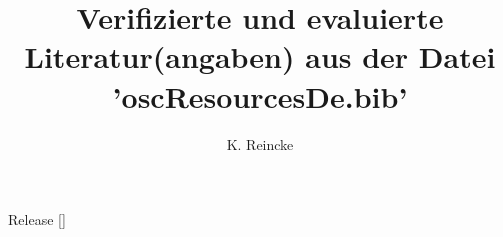 \documentclass[DIV=calc,BCOR=5mm,11pt,headings=small,oneside,abstract=true,toc=bib]{scrartcl}
\begin{document}
\nocite{*}


\subject{Open Source Sekundärtliteratur für das OSLiC}
\title{Verifizierte und evaluierte Literatur(angaben) aus der
Datei 'oscResourcesDe.bib'}
\author{K. Reincke}

\maketitle
Release []
\small


\footnotesize


\printnomenclature
\end{document}
